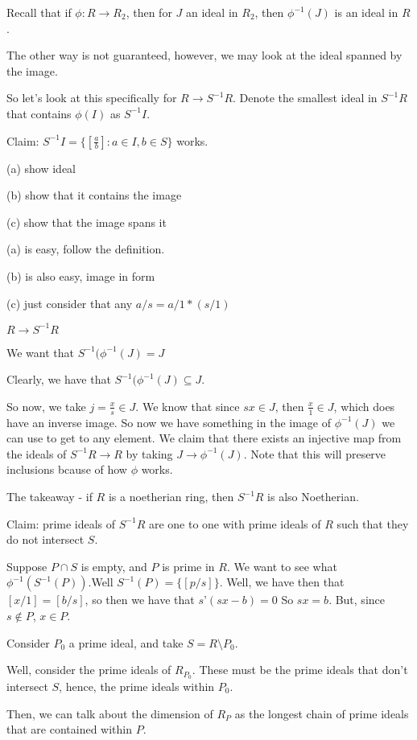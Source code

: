 \documentclass[10pt]{article}
\begin{document}
Recall that if $\phi: R \to R_2$, then for $J$ an ideal in $R_2$, then $\phi^{-1}(J)$ is an ideal in $R$. 

The other way is not guaranteed, however, we may look at the ideal spanned by the image. 

So let’s look at this specifically for $R \to S^{-1}R$. Denote the smallest ideal in $S^{-1}R$ that contains $\phi(I)$ as $S^{-1}I$.

Claim: $S^{-1}I = \{ [\frac{a}{b} ] : a \in I, b \in S \}$ works. 

(a) show ideal

(b) show that it contains the image

(c) show that the image spans it

(a) is easy, follow the definition. 

(b) is also easy, image in form

(c) just consider that any $a/s = a/1 * (s/1)$

$R \to S^{-1}R$

We want that $S^{-1}(\phi^{-1}(J) = J$

Clearly, we have that $S^{-1}(\phi^{-1}(J) \subseteq J$.

So now, we take $j  = \frac{x}{s} \in J$. We know that since $sx \in J$, then $ \frac{x}{1} \in J$, which does have an inverse image. So now we have something in the image of $\phi^{-1}(J)$ we can use to get to any element. We claim that there exists an injective map from the ideals of $S^{-1}R \to R$ by taking $J \to \phi^{-1}(J)$. Note that this will preserve inclusions bcause of how $\phi$ works.

The takeaway - if $R$ is a noetherian ring, then $S^{-1}R$ is also Noetherian.

Claim: prime ideals of $S^{-1}R$ are one to one with prime ideals of $R$ such that they do not intersect $S$.

Suppose $P \cap S$ is empty, and $P$ is prime in $R$. We want to see what $\phi^{-1}(S^{-1}(P))$.Well $S^{-1}(P) = \{ [p/s] \}$. Well, we have then that $[x/1] = [b/s]$, so then we have that $s’(sx - b) = 0$ So $sx = b$. But, since $s \not \in P$, $x \in P$. 

Consider $P_0$ a prime ideal, and take $S = R \setminus P_0$. 

Well, consider the prime ideals of $R_{P_0}$. These must be the prime ideals that don’t intersect $S$, hence, the prime ideals within $P_0$.

Then, we can talk about the dimension of $R_P$ as the longest chain of prime ideals that are contained within $P$.
\end{document}
